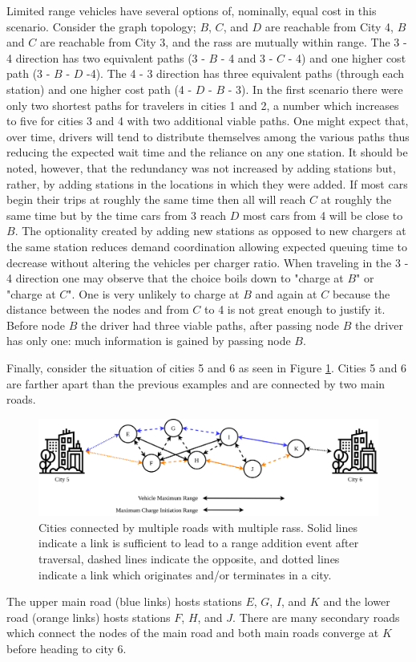 Limited range vehicles have several options of, nominally, equal cost in this scenario. Consider the graph topology; $B$, $C$, and $D$ are reachable from City 4, $B$ and $C$ are reachable from City 3, and the \glspl{ras} are mutually within range. The 3 - 4 direction has two equivalent paths (3 - $B$ - 4 and 3 - $C$ - 4) and one higher cost path (3 - $B$ - $D$ -4). The 4 - 3 direction has three equivalent paths (through each station) and one higher cost path (4 - $D$ - $B$ - 3). In the first scenario there were only two shortest paths for travelers in cities 1 and 2, a number which increases to five for cities 3 and 4 with two additional viable paths. One might expect that, over time, drivers will tend to distribute themselves among the various paths thus reducing the expected wait time and the reliance on any one station. It should be noted, however, that the redundancy was not increased by adding stations but, rather, by adding stations in the locations in which they were added. If most cars begin their trips at roughly the same time then all will reach $C$ at roughly the same time but by the time cars from 3 reach $D$ most cars from 4 will be close to $B$. The optionality created by adding new stations as opposed to new chargers at the same station reduces demand coordination allowing expected queuing time to decrease without altering the vehicles per charger ratio. When traveling in the 3 - 4 direction one may observe that the choice boils down to "charge at $B$" or "charge at $C$". One is very unlikely to charge at $B$ and again at $C$ because the distance between the nodes and from $C$ to 4 is not great enough to justify it. Before node $B$ the driver had three viable paths, after passing node $B$ the driver has only one: much information is gained by passing node $B$.

Finally, consider the situation of cities 5 and 6 as seen in Figure \ref{fig:connected_cities_3}. Cities 5 and 6 are farther apart than the previous examples and are connected by two main roads.

\begin{figure}[H]
	\centering
	\includegraphics[width = \linewidth]{figs/connected_cities_3.png}
	\caption{Cities connected by multiple roads with multiple \glspl{ras}. Solid lines indicate a link is sufficient to lead to a range addition event after traversal, dashed lines indicate the opposite, and dotted lines indicate a link which originates and/or terminates in a city.}
	\label{fig:connected_cities_3}
\end{figure}

The upper main road (blue links) hosts stations $E$, $G$, $I$, and $K$ and the lower road (orange links) hosts stations $F$, $H$, and $J$. There are many secondary roads which connect the nodes of the main road and both main roads converge at $K$ before heading to city 6.